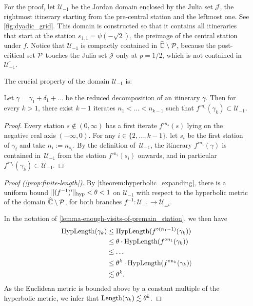 For the proof, let $\mathcal U_{-1}$ be the Jordan domain enclosed by the Julia set $\mathcal J$, 
the rightmost itinerary starting from the pre-central station and the leftmost one. 
See \cref{fig:dyadic_grid}.
This domain is constructed so that it contains all itineraries that start at the station 
$s_{1,1} = \psi(-\sqrt{2})$, the preimage of the central station under $f$. 
Notice that $\mathcal U_{-1}$ is compactly contained in $\widehat{\mathbb C} \setminus \operatorname{\mathcal P}$, because the post-critical set $\operatorname{\mathcal P}$ touches the Julia set $\mathcal J$ only at $p=1/2$, which is not contained in $\overline{\mathcal U_{-1}}$.

The crucial property of the domain $\mathcal U_{-1}$ is: 

\begin{lemma} \label{lemma-enough-visits-of-premain_station}
	Let $\gamma = \gamma_1 + \delta_1 + \dots $ be the reduced decomposition of an itinerary $\gamma$. Then for every $k > 1$, there exist $k-1$ iterates $n_1 < \dots < n_{k-1}$ such that $f^{\circ {n_i}}(\gamma_k) \subset \mathcal U_{-1}$. %
\end{lemma}

\begin{proof}
	Every station $s \not \in (0, \infty)$ has a first iterate $f^{\circ n_s}(s)$ lying on the negative real axis $(-\infty, 0)$.
	For any $i \in \{2, \dots, k-1\}$, let $s_i$ be the first station of $\gamma _i$ and take $n_i := n_{s_i}$.
	By the definition of $\,\mathcal U_{-1}$, the itinerary $f^{\circ n_i}(\gamma)$ is contained in  $\,\mathcal U_{-1}$ from the station $f^{\circ n_i}(s_i)$ onwards, and in particular $f^{\circ n_i}(\gamma_k) \subset \mathcal U_{-1}$.
\end{proof}
\begin{proof}[Proof (\cref{prop:finite-length})] 
By \cref{theorem:hyperbolic_expanding}, there is a uniform bound $\Vert (f^{-1})' \Vert_{\operatorname{hyp}}< \theta < 1$ on $\mathcal U_{-1}$
with respect to the hyperbolic metric of the domain $\widehat{\mathbb C} \setminus \operatorname{\mathcal P}$, for both branches $f^{-1}: \mathcal U_{-1} \to \mathcal U_{\pm i}$. 

In the notation of \cref{lemma-enough-visits-of-premain_station}, we then have 
\begin{align*}
	\operatorname{HypLength}(\gamma_k)  &  \leq \operatorname{HypLength}(f^{\circ (n_1-1)}(\gamma_k)) \\ 
	& \leq \theta \cdot \operatorname{HypLength}(f^{\circ n_1}(\gamma_k))\\
	& \leq  \dots \\
	 & \leq \theta^k \cdot \operatorname{HypLength}(f^{\circ n_k}(\gamma_k)) \\
	 & \lesssim \theta^k.
\end{align*}
As the Euclidean metric is bounded above by a constant multiple of the hyperbolic metric, we infer that $\operatorname{Length}(\gamma_k) \lesssim \theta^k$.
\end{proof}


